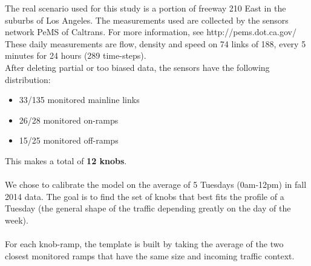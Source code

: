 The real scenario used for this study is a portion of freeway 210 East in the suburbs of Los Angeles. The measurements used are collected by the sensors network PeMS of Caltrans. For more information, see http://pems.dot.ca.gov/\\
These daily measurements are flow, density and speed on 74 links of 188, every 5 minutes for 24 hours (289 time-steps).\\
After deleting partial or too biased data, the sensors have the following distribution:
\begin{itemize}
	\item 33/135 monitored mainline links
	\item 26/28 monitored on-ramps
	\item 15/25 monitored off-ramps
\end{itemize}
This makes a total of \textbf{12 knobs}.\\
\\
We chose to calibrate the model on the average of 5 Tuesdays (0am-12pm) in fall 2014 data. The goal is to find the set of knobs that best fits the profile of a Tuesday (the general shape of the traffic depending greatly on the day of the week).\\
\\
For each knob-ramp, the template is built by taking the average of the two closest monitored ramps that have the same size and incoming traffic context. 